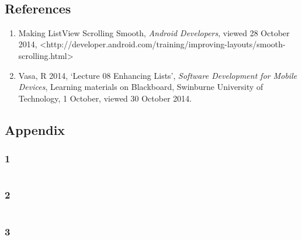 \documentclass[11pt,english,numbers=endperiod,parskip=half]{scrartcl}
\begin{document}
\begin{figure}[H]
\\
\end{figure}

\subsection{References}
\begin{enumerate}
	\item{Making ListView Scrolling Smooth, \textit{Android Developers},
	viewed 28 October 2014,
	\textless http://developer.android.com/training/improving-layouts/smooth-scrolling.html\textgreater}
	\item{Vasa, R 2014, `Lecture 08 Enhancing Lists', \textit{Software Development for Mobile Devices},
	Learning materials on Blackboard, Swinburne University of Technology, 1 October, viewed 30 October 2014.}
\end{enumerate}

\begin{landscape}
\subsection{Appendix}
\subsubsection{1}
\inputminted[firstline=64, lastline=94, frame=single]{java}{../../Apps/MovieRatings/app/src/main/java/swin/examples/MovieRatingsActivity.java}
\subsubsection{2}
\inputminted[firstline=45, lastline=51, frame=single]{java}{../../Apps/MovieRatings/app/src/main/java/swin/examples/MovieRatingsActivity.java}
\subsubsection{3}
\inputminted[firstline=164, lastline=190, frame=single]{java}{../../Apps/MovieRatings/app/src/main/java/swin/examples/MovieRatingsActivity.java}
\end{landscape}
\end{document}
